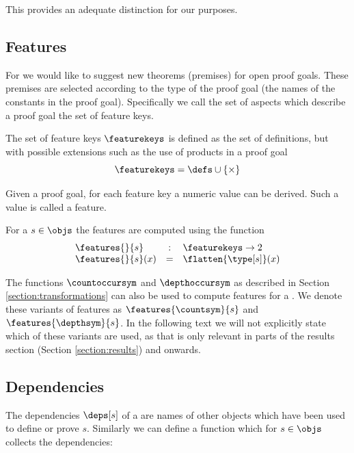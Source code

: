 This provides an adequate distinction for our purposes.

\subsection{Features}
\label{section:feats}

For \premiseselection we would like to suggest new theorems (premises) for open proof goals.
These premises are selected according to the type of the proof goal (the names of the constants in the proof goal).
Specifically we call the set of aspects which describe a proof goal the set of feature keys.

\begin{definition}\label{def:featurekeys}
  The set of feature keys $\featurekeys$ is defined as the set of definitions, but with possible extensions such as the use of products in a proof goal
  \[ \featurekeys = \defs \cup \{ \times \} \]
\end{definition}

Given a proof goal, for each feature key a numeric value can be derived.
Such a value is called a feature.

\begin{definition}\label{def:features}
  For a \coqobj $s \in \objs$ the features are computed using the function
  $$
  \begin{array}{lcl}
    \features{}{s} & : & \featurekeys \rightarrow 2 \\
    \features{}{s}(x) & = & \flatten{\type[s]}(x)
  \end{array}
  $$
\end{definition}

The functions $\countoccursym$ and $\depthoccursym$ as described in Section \ref{section:transformations} can also be used to compute features for a \coqobj.
We denote these variants of features as $\features{\countsym}{s}$ and $\features{\depthsym}{s}$.
In the following text we will not explicitly state which of these variants are used,
as that is only relevant in parts of the results section (Section \ref{section:results}) and onwards.

\subsection{Dependencies}
\label{sections:deps}

The dependencies $\deps[s]$ of a \coqobj[s] are names of other objects which have been used to define or prove $s$.
Similarly we can define a function which for $s \in \objs$ collects the dependencies:

